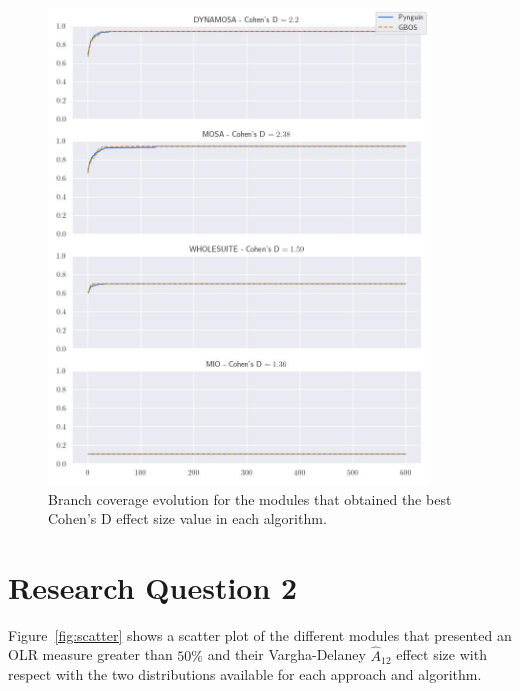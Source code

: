 \documentclass[%
  chapterprefix=false,%
  open=right,%
  twoside=true,%
  paper=a4,%
  logofile={Figures/logo.png},%
  thesistype=master,%
  UKenglish,%
]{se2thesis}
\begin{document}
\begin{figure}[ptbh]
  \centering
  \includegraphics[width=0.9\textwidth]{Figures/Results/bestES.jpg}
  \caption{Branch coverage evolution for the modules that obtained the best Cohen's D effect size value in each algorithm.}\label{fig:best}
\end{figure}

\newpage


\section{Research Question 2}

Figure~\ref{fig:scatter} shows a scatter plot of the different modules that presented an OLR measure greater than \(50\%\) and their Vargha-Delaney \(\hat{A}_{12}\) effect size with respect with the two distributions available for each approach and algorithm.
\end{document}
